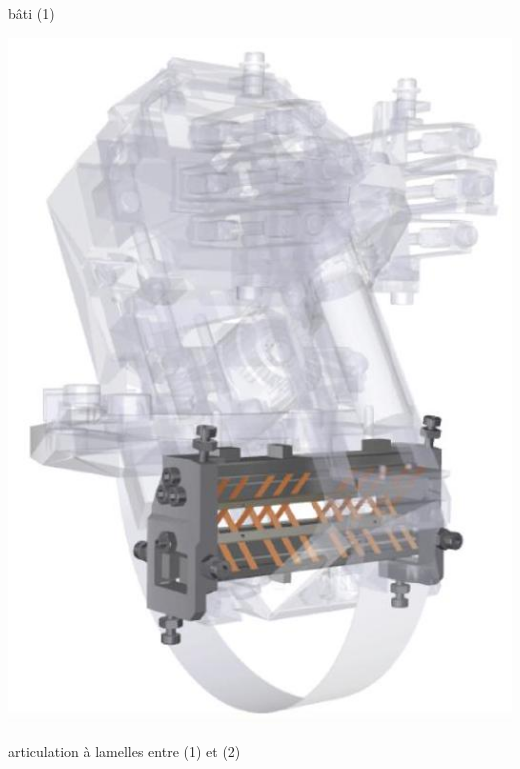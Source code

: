 \documentclass[10pt]{article}
\begin{document}
bâti (1)

\begin{center}
\includegraphics[max width=\textwidth]{2024_04_26_3285cfc264024262add0g-15(2)}
\end{center}

articulation à lamelles entre (1) et (2)
\end{document}
